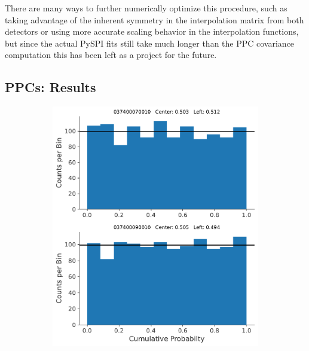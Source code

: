 \documentclass{report}
\begin{document}
There are many ways to further numerically optimize this procedure, such as taking advantage of the inherent symmetry in the interpolation matrix from both detectors or using more accurate scaling behavior in the interpolation functions, but since the actual PySPI fits still take much longer than the PPC covariance computation this has been left as a project for the future.


\subsection{PPCs: Results} \label{sec ppc results}

\begin{figure}[h]
  \centering
  \begin{subfigure}{0.5\textwidth}
    \centering
    \includegraphics[width=0.9\linewidth]{Images/PPC_and_Background_Analysis/037400070010_037400090010_cdf.pdf}
  \end{subfigure}%
  \begin{subfigure}{.5\textwidth}
    \centering

\end{subfigure}
\end{figure}
\end{document}
